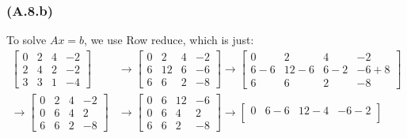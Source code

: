 \documentclass[]{article}
\begin{document}
        \subsubsection*{(A.8.b)}
            To solve $Ax = b$, we use Row reduce, which is just: 
            \begin{align*}\tag{2.8.b.1}\label{eqn:2.8.b.1}
                \begin{bmatrix}
                    0 & 2 & 4 & -2
                    \\
                    2 & 4 & 2 & -2
                    \\
                    3 & 3 & 1 & -4
                \end{bmatrix}
                &\rightarrow
                \begin{bmatrix}
                    0 & 2 & 4 & -2
                    \\
                    6 & 12 & 6 & -6
                    \\
                    6 & 6 & 2 & -8
                \end{bmatrix}
                \rightarrow
                \begin{bmatrix}
                    0 & 2 & 4 & -2
                    \\
                    6 - 6 & 12 - 6 & 6- 2 & -6 + 8
                    \\
                    6 & 6 & 2 & -8
                \end{bmatrix}
                \\
                \rightarrow
                \begin{bmatrix}
                    0 & 2 & 4 & -2
                    \\
                    0 & 6 & 4 & 2
                    \\
                    6 & 6 & 2 & -8
                \end{bmatrix}
                &\rightarrow 
                \begin{bmatrix}
                    0 & 6 & 12 & -6
                    \\
                    0 & 6 & 4 & 2
                    \\
                    6 & 6 & 2 & -8
                \end{bmatrix}
                \rightarrow
                \begin{bmatrix}
                    0 & 6 - 6 & 12 - 4 & -6 - 2
                    \\

\end{bmatrix}
\end{align*}
\end{document}
